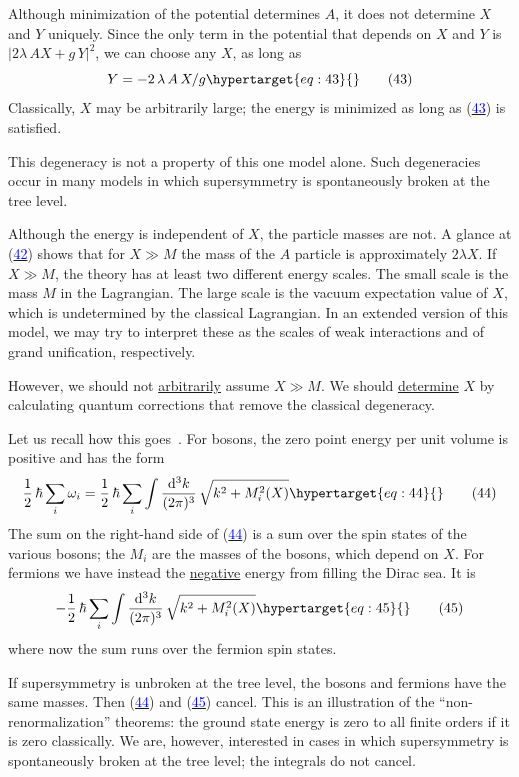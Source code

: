 \documentclass[11pt,a4paper]{article}
\newcommand{\eqtarget}[1]{\hypertarget{eq:#1}{\mathstrut}\tag{#1}}
\newcommand{\eqnref}[1]{(\hyperlink{eq:#1}{\textcolor{blue}{#1}})}
\newcommand{\dd}{\mathop{}\!\mathrm{d}}
\begin{document}
Although minimization of the potential determines $A$, it does not
determine $X$ and $Y$ uniquely. Since the only term in the potential that
depends on $X$ and $Y$ is $|2 \lambda\, A X + g\, Y|^2$, we can choose any $X$, as long as
\begin{equation}
Y = -2\, \lambda\, A\, X / g
\eqtarget{43}
\end{equation}
Classically, $X$ may be arbitrarily large; the energy is minimized as
long as \eqnref{43} is satisfied.

This degeneracy is not a property of this one model alone.
Such degeneracies occur in many models in which supersymmetry is
spontaneously broken at the tree level.

Although the energy is independent of $X$, the particle masses
are not. A glance at \eqnref{42} shows that for $X \gg M$ the mass of the $A$
particle is approximately $2 \lambda X$. If $X \gg M$, the theory has at least
two different energy scales. The small scale is the mass $M$ in the
Lagrangian. The large scale is the vacuum expectation value of $X$,
which is undetermined by the classical Lagrangian. In an extended
version of this model, we may try to interpret these as the scales
of weak interactions and of grand unification, respectively.

However, we should not \underline{arbitrarily} assume $X \gg M$. We should
\underline{determine} $X$ by calculating quantum corrections that remove the classical
degeneracy.

Let us recall how this goes~\cite{ref15}. For bosons, the zero point
energy per unit volume is positive and has the form
\begin{equation}
\frac{1}{2}\,\hbar \sum_i \omega_i = \frac{1}{2}\,\hbar \sum_i \int \frac{\dd^3 k}{(2\pi)^3}\, \sqrt{k^2 + M_i^2(X)}
\eqtarget{44}
\end{equation}
The sum on the right-hand side of \eqnref{44} is a sum over the spin states
of the various bosons; the $M_i$ are the masses of the bosons, which
depend on $X$. For fermions we have instead the \underline{negative} energy from
filling the Dirac sea. It is
\begin{equation}
- \frac{1}{2}\,\hbar \sum_i \int \frac{\dd^3 k}{(2\pi)^3}\, \sqrt{k^2 + M_i^2(X)}
\eqtarget{45}
\end{equation}
where now the sum runs over the fermion spin states.

If supersymmetry is unbroken at the tree level, the bosons and
fermions have the same masses. Then \eqnref{44} and \eqnref{45} cancel. This is
an illustration of the ``non-renormalization'' theorems: the ground
state energy is zero to all finite orders if it is zero classically.
We are, however, interested in cases in which supersymmetry is
spontaneously broken at the tree level; the integrals do not cancel.
\end{document}
